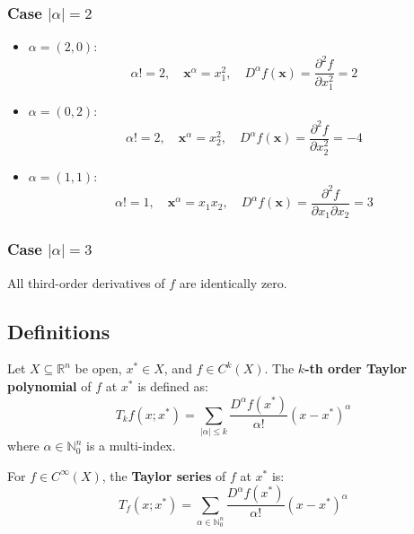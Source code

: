 \documentclass{article}
\begin{document}
\subsubsection{Case \( |\alpha| = 2 \)}
\begin{itemize}
    \item \( \alpha = (2, 0) \):
    \[
    \alpha! = 2, \quad \bm{x}^\alpha = x_1^2, \quad D^\alpha f(\bm{x}) = \frac{\partial^2 f}{\partial x_1^2} = 2
    \]
    \item \( \alpha = (0, 2) \):
    \[
    \alpha! = 2, \quad \bm{x}^\alpha = x_2^2, \quad D^\alpha f(\bm{x}) = \frac{\partial^2 f}{\partial x_2^2} = -4
    \]
    \item \( \alpha = (1, 1) \):
    \[
    \alpha! = 1, \quad \bm{x}^\alpha = x_1x_2, \quad D^\alpha f(\bm{x}) = \frac{\partial^2 f}{\partial x_1 \partial x_2} = 3
    \]
\end{itemize}

\subsubsection{Case \( |\alpha| = 3 \)}
All third-order derivatives of \( f \) are identically zero.

\subsection*{Definitions}
Let \( X \subseteq \mathbb{R}^n \) be open, \( x^* \in X \), and \( f \in C^k(X) \). The \textbf{\(k\)-th order Taylor polynomial} of \( f \) at \( x^* \) is defined as:
\[
T_k f(x; x^*) = \sum_{|\alpha| \leq k} \frac{D^\alpha f(x^*)}{\alpha!} (x - x^*)^\alpha
\]
where \( \alpha \in \mathbb{N}_0^n \) is a multi-index.

For \( f \in C^\infty(X) \), the \textbf{Taylor series} of \( f \) at \( x^* \) is:
\[
T_f(x; x^*) = \sum_{\alpha \in \mathbb{N}_0^n} \frac{D^\alpha f(x^*)}{\alpha!} (x - x^*)^\alpha
\]
\end{document}
